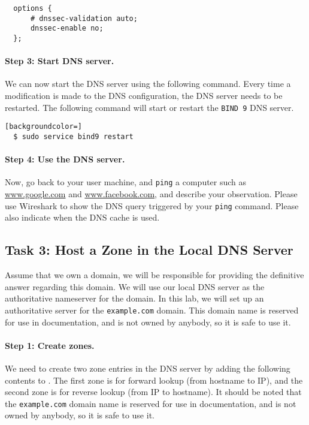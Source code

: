 \begin{lstlisting}
  options {
      # dnssec-validation auto;
      dnssec-enable no;
  };
\end{lstlisting}


\paragraph{Step 3: Start DNS server.}
We can now start the DNS server using the following command. Every time
a modification is made to the DNS configuration, the DNS server needs to be
restarted. The following command will start or restart the \texttt{BIND 9}
DNS server.

\begin{lstlisting}[backgroundcolor=]
  $ sudo service bind9 restart
\end{lstlisting}


\paragraph{Step 4: Use the DNS server.}
Now, go back to your user machine, and \texttt{ping} a computer such as 
\url{www.google.com} and \url{www.facebook.com}, and describe your
observation. Please use Wireshark to show the DNS query 
triggered by your \texttt{ping} command. Please also indicate when the DNS
cache is used. 



\subsection{Task 3: Host a Zone in the Local DNS Server}

Assume that we own a domain, 
we will be responsible for providing the
definitive answer regarding this domain.
We will use our local DNS server as the authoritative nameserver for
the domain. In this lab, we will set up an authoritative server
for the \texttt{example.com} domain. 
This domain name is reserved for use in documentation, and is not owned
by anybody, so it is safe to use it.

\paragraph{Step 1: Create zones.}
We need to create two zone entries
in the DNS server by adding the following contents to
.
The first zone is for forward lookup (from hostname to IP),
and the second zone is for reverse lookup (from IP to hostname).
It should be noted that the \texttt{example.com}
domain name is reserved for use in documentation, and is not owned
by anybody, so it is safe to use it.


